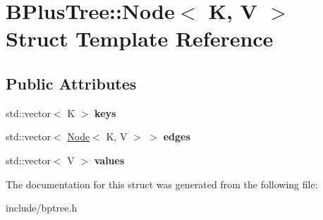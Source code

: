 \hypertarget{struct_b_plus_tree_1_1_node}{}\section{B\+Plus\+Tree\+:\+:Node$<$ K, V $>$ Struct Template Reference}
\label{struct_b_plus_tree_1_1_node}
\subsection*{Public Attributes}
\begin{DoxyCompactItemize}
\item 
\mbox{\label{struct_b_plus_tree_1_1_node_a86fcd3fb476654ff940932e5a0727497}} 
std\+::vector$<$ K $>$ {\bfseries keys}
\item 
\mbox{\label{struct_b_plus_tree_1_1_node_a837f51e703d489dfc8f326a262c8d3ba}} 
std\+::vector$<$ \hyperlink{struct_b_plus_tree_1_1_node}{Node}$<$ K, V $>$ $>$ {\bfseries edges}
\item 
\mbox{\label{struct_b_plus_tree_1_1_node_a09ff79beef41471d1e273c46f55c2fc9}} 
std\+::vector$<$ V $>$ {\bfseries values}
\end{DoxyCompactItemize}


The documentation for this struct was generated from the following file\+:\begin{DoxyCompactItemize}
\item 
include/bptree.\+h\end{DoxyCompactItemize}
